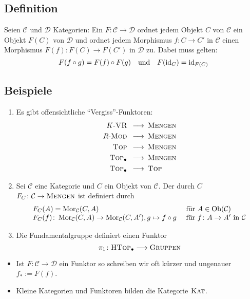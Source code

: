 \subsection[Definition: Funktor]{Definition} %
\label{sub:14}
Seien $\mathcal{C}$ und $\mathcal{D}$ Kategorien: Ein  $F \colon \mathcal{C} \to \mathcal{D}$ ordnet jedem Objekt $C$ von $\mathcal{C}$ ein Objekt $F(C)$ von 
$\mathcal{D}$ und ordnet jedem Morphismus $f : C \to C'$ in $\mathcal{C}$ einen Morphismus $F(f) \colon F(C) \to F(C')$ in $\mathcal{D}$ zu. Dabei muss gelten:
\[
	F(f \circ g) = F(f) \circ F(g) \quad \text{und} \quad F(\operatorname{id}_C) = \operatorname{id}_{F(C)}
\] 

\subsection[Beispiele für Funktoren]{Beispiele} %
\label{sub:15}
\begin{enumerate}[(1)]
	\item Es gibt offensichtliche \enquote{Vergiss}-Funktoren:
	\begin{align*}
		K\text{-}\textsc{VR} \enspace\longrightarrow & \enspace\textsc{Mengen} \\
		R\text{-}\textsc{Mod} \enspace\longrightarrow & \enspace\textsc{Mengen} \\
		\textsc{Top} \enspace\longrightarrow & \enspace\textsc{Mengen} \\
		\textsc{Top}_\bullet \enspace\longrightarrow & \enspace\textsc{Mengen} \\
		\textsc{Top}_\bullet \enspace\longrightarrow & \enspace \textsc{Top}
	\end{align*}
	\item Sei $\mathcal{C}$ eine Kategorie und $C$ ein Objekt von $\mathcal{C}$. Der durch $C$  
	$F_C \colon \mathcal{C} \to \textsc{Mengen}$ ist definiert durch 
	\[
		\begin{array}{ll}
			F_C(A) = \operatorname{Mor}_\mathcal{C}(C,A) &\text{ für } A \in  \operatorname{Ob}(\mathcal{C}) \\
			F_C(f) \colon \operatorname{Mor}_\mathcal{C}(C,A) \to \operatorname{Mor}_\mathcal{C}(C,A'), g \mapsto f \circ  g &\text{ für } f \colon A \to A' \text{ in } \mathcal{C}
		\end{array}
	\]
	\item Die Fundamentalgruppe definiert einen Funktor
	\[
		\pi_1 \colon \textsc{HTop}_\bullet \longrightarrow \textsc{Gruppen}
	\]
\end{enumerate}
\begin{itemize}
	\item Ist $F \colon \mathcal{C} \to \mathcal{D}$ ein Funktor so schreiben wir oft kürzer und ungenauer $f_* := F(f)$.
	\item Kleine Kategorien und Funktoren bilden die Kategorie $\textsc{Kat}$.
\end{itemize}

